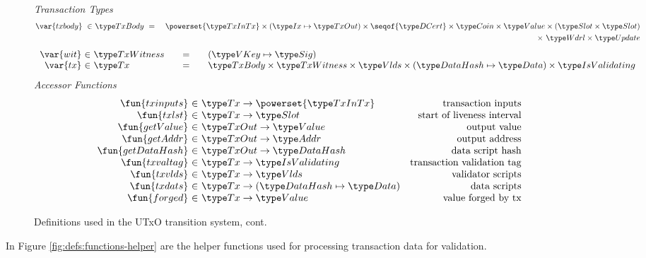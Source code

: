 \begin{figure*}[htb]
  \emph{Transaction Types}
  \begin{align*}
    \var{txbody} ~\in~
    & \TxBody ~=~
    & \powerset{\TxInTx} \times (\Ix \mapsto \TxOut) \times \seqof{\DCert}
      \times \Coin \times \Value \times (\Slot\times\Slot) \\
    & ~& \times~ \Wdrl \times \Update
  \end{align*}
  \begin{equation*}
    \begin{array}{r@{~\in~}l@{\qquad=\qquad}l}
      \var{wit} & \TxWitness & (\VKey \mapsto \Sig)
      \\
      \var{tx}
      & \Tx
      & \TxBody \times \TxWitness \times \Vlds \times (\HashDat \mapsto \Data) \times \IsValidating
    \end{array}
  \end{equation*}
  \emph{Accessor Functions}
  \begin{equation*}
    \begin{array}{r@{~\in~}lr}
      \fun{txinputs} & \Tx \to \powerset{\TxInTx} & \text{transaction inputs} \\
      \fun{txlst} & \Tx \to \Slot & \text{start of liveness interval} \\
      \fun{getValue} & \TxOut \to \Value & \text{output value} \\
      \fun{getAddr} & \TxOut \to \Addr & \text{output address} \\
      \fun{getDataHash} & \TxOut \to \HashDat & \text{data script hash} \\
      \fun{txvaltag} & \Tx \to \IsValidating & \text{transaction validation tag}\\
      \fun{txvlds} & \Tx \to \Vlds & \text{validator scripts}\\
      \fun{txdats} & \Tx \to (\HashDat \mapsto \Data) & \text{data scripts}\\
      \fun{forged} & \Tx \to \Value & \text{value forged by tx}\\
    \end{array}
  \end{equation*}
  \caption{Definitions used in the UTxO transition system, cont.}
  \label{fig:defs:utxo-shelley-2}
\end{figure*}


In Figure \ref{fig:defs:functions-helper} are the helper functions used for
processing transaction data for validation.

